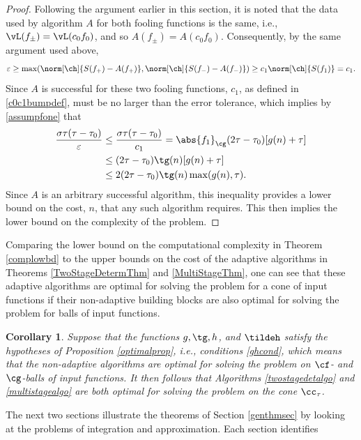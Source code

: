 \documentclass[]{elsarticle}
\newtheorem{cor}{Corollary}
\theoremstyle{definition}
\theoremstyle{remark}
\newcommand{\Gnorm}[1]{\abs{#1}_{\cg}}
\begin{document}
\begin{proof}
Following the argument earlier in this section, it is noted that the data used by algorithm $A$ for both fooling functions is the same, i.e., $\vL(f_{\pm})=\vL(c_0f_0)$, and so $A(f_{\pm})=A(c_0f_0)$.  Consequently, by the same argument used above, 
\[
\varepsilon  \ge  \max(\norm[\ch]{S(f_+)-A(f_+)},\norm[\ch]{S(f_-)-A(f_-)}) \ge c_1 \norm[\ch]{S(f_1)}=c_1.
\]
Since $A$ is successful for these two fooling functions, $c_1$, as defined in \eqref{c0c1bumpdef}, must be no larger than the error tolerance, which implies by \eqref{assumpfone} that 
\begin{align*}
\frac{\sigma \tau(\tau-\tau_0)}{\varepsilon} & \le \frac{\sigma \tau(\tau-\tau_0)}{c_1}  = \Gnorm{f_1} (2\tau - \tau_0) [g(n) + \tau] \\
&\le (2\tau - \tau_0) \tg(n) [g(n) + \tau] \\
&\le 2 (2\tau - \tau_0) \tg(n)\max(g(n), \tau).
\end{align*}
Since $A$ is an arbitrary successful algorithm, this inequality provides a lower bound on the cost, $n$, that any such algorithm requires.  This then implies the lower bound on the complexity of the problem.   
\end{proof}

Comparing the lower bound on the computational complexity in Theorem \ref{complowbd} to the upper bounds on the cost of the adaptive algorithms in Theorems \ref{TwoStageDetermThm} and \ref{MultiStageThm}, one can see that these adaptive algorithms are optimal for solving the problem for a cone of input functions if their non-adaptive building blocks are also optimal for solving the problem for balls of input functions.

\begin{cor} \label{optimcor}
Suppose that the functions $g, \tg, h$, and $\tildeh$ satisfy the hypotheses of Proposition \ref{optimalprop}, i.e., conditions \eqref{ghcond}, which means that the non-adaptive algorithms are optimal for solving the problem on $\cf$- and $\cg$-balls of input functions.  It then follows that Algorithms \ref{twostagedetalgo} and \ref{multistagealgo} are both optimal for solving the  problem on the cone $\cc_{\tau}$.  
\end{cor}

\vspace{0.5cm}

The next two sections illustrate the theorems of Section \ref{genthmsec} by looking at the problems of integration and approximation.  Each section identifies 
\end{document}
